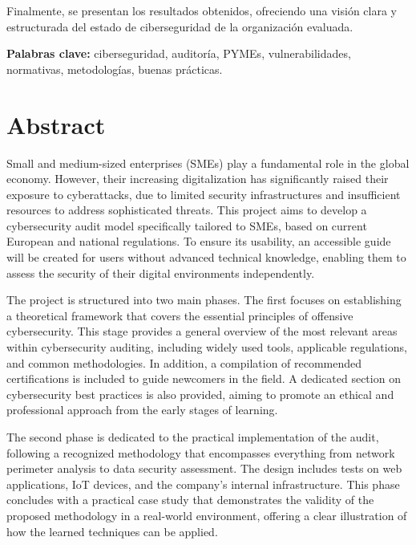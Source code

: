 \documentclass[a4paper, 10pt]{article}
\begin{document}
\par\vspace{0.5cm}

Finalmente, se presentan los resultados obtenidos, ofreciendo una visión clara y estructurada del estado de ciberseguridad de la organización evaluada.
\par\vspace{0.5cm}
\textbf{Palabras clave:} ciberseguridad, auditoría, PYMEs, vulnerabilidades, normativas, metodologías, buenas prácticas.
\clearpage


\section*{Abstract}
\thispagestyle{empty}
Small and medium-sized enterprises (SMEs) play a fundamental role in the global economy. However, their increasing digitalization has significantly raised their exposure to cyberattacks, due to limited security infrastructures and insufficient resources to address sophisticated threats.
This project aims to develop a cybersecurity audit model specifically tailored to SMEs, based on current European and national regulations. To ensure its usability, an accessible guide will be created for users without advanced technical knowledge, enabling them to assess the security of their digital environments independently.

\par\vspace{0.5cm}

The project is structured into two main phases. The first focuses on establishing a theoretical framework that covers the essential principles of offensive cybersecurity. This stage provides a general overview of the most relevant areas within cybersecurity auditing, including widely used tools, applicable regulations, and common methodologies. In addition, a compilation of recommended certifications is included to guide newcomers in the field. A dedicated section on cybersecurity best practices is also provided, aiming to promote an ethical and professional approach from the early stages of learning.

\par\vspace{0.5cm}

The second phase is dedicated to the practical implementation of the audit, following a recognized methodology that encompasses everything from network perimeter analysis to data security assessment. The design includes tests on web applications, IoT devices, and the company’s internal infrastructure. This phase concludes with a practical case study that demonstrates the validity of the proposed methodology in a real-world environment, offering a clear illustration of how the learned techniques can be applied.
\end{document}
